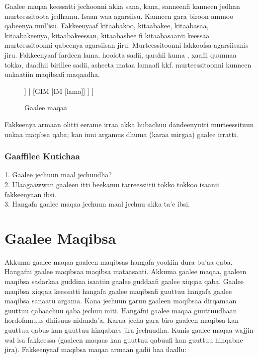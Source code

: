 \documentclass[11pt,b5paper]{book}
\begin{document}
Gaalee maqaa keessatti jechoonni akka sana, kana, sanneenfi kanneen jedhan murteessitoota jedhamu. Isaan waa agarsiisu. Kanneen gara biroon ammoo qabeenya mul’isu. Fakkeenyaaf kitaabakoo, kitaabakee, kitaabasaa, kitaabakeenya, kitaabakeessan, kitaabashee fi kitaabasaanii keessaa murteessitoonni qabeenya agarsiisan jiru. Murteessitoonni lakkoofsa agarsiisanis jiru. Fakkeenyaaf fardeen lama, hoolota sadii, qarshii kuma , xaafii quunnaa tokko, daadhii birillee sadii, asheeta mataa lamaafi kkf. murteessitoonni kunneen unkaatiin maqibsafi maqaadha.

\begin{figure}[H]										
	\caption{Gaalee maqaa}
	\centering
	\begin{forest}
		[GMG
			[GM
				[M [fardeen]]
			]
			[GIM
				[IM [lama]]
			]
		]
	\end{forest}
\end{figure}

Fakkeenya armaan olitti eerame irraa akka hubachuu dandeenyutti murteessituun unkaa maqibsa qaba; kan inni
argamus dhuma (karaa mirgaa) gaalee irratti.

\subsubsection{Gaaffilee Kutichaa}
1. Gaalee jechuun maal jechuudha?\\
2. Ulaagaawwan gaaleen itti beekamu tarreessiitii tokko tokkoo isaanii fakkeenyaan ibsi.\\
3. Hangafa gaalee maqaa jechuun maal jechuu akka ta'e ibsi.

\section{Gaalee Maqibsa}
Akkuma gaalee maqaa gaaleen maqibsas hangafa yookiin dura bu’aa qaba. Hangafni gaalee maqibsaa maqibsa mataasaati.
Akkuma gaalee maqaa, gaaleen maqibsa sadarkaa guddina isaatiin gaalee guddaafi gaalee xiqqaa qaba. Gaalee maqibsa
xiqqaa keessatti hangafa gaalee maqibsafi guuttuu hangafa gaalee maqibsa sanaatu argama. Kana jechuun garuu gaaleen
maqibsaa dirqamaan guuttuu qabaachuu qaba jechuu miti. Hangafni gaalee maqaa guuttuudhaan hordofamuus dhiisuus
nidanda’a. Karaa jecha gara biro gaaleen maqibsa kan guuttuu qabus kan guuttuu hinqabnes jira jechuudha. Kunis gaalee maqaa wajjin wal isa fakkeessa (gaaleen maqaas kan guuttuu qabuufi kan guuttuu hinqabne jira). Fakkeenyaaf maqibsa maqaa armaan gadii haa ilaallu:
\end{document}
